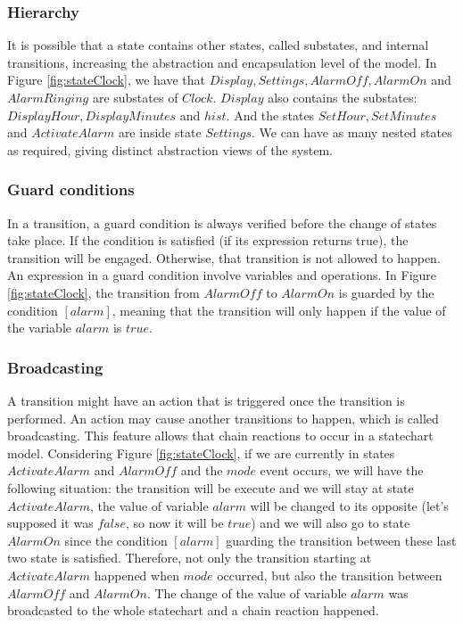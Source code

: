 \subsubsection{Hierarchy}

It is possible that a state contains other states, called substates, and internal transitions, increasing the abstraction and encapsulation level of the model. In Figure \ref{fig:stateClock}, we have that $Display, Settings, AlarmOff, AlarmOn$ and $AlarmRinging$ are substates of $Clock$. $Display$ also contains the substates: $DisplayHour, DisplayMinutes$ and $hist$. And the states $SetHour, SetMinutes$ and $ActivateAlarm$ are inside state $Settings$. We can have as many nested states as required, giving distinct abstraction views of the system.

\subsubsection{Guard conditions}

In a transition, a guard condition is always verified before the change of states take place. If the condition is satisfied (if its expression returns true), the transition will be engaged. Otherwise, that transition is not allowed to happen. An expression in a guard condition involve variables and operations. In Figure \ref{fig:stateClock}, the transition from $AlarmOff$ to $AlarmOn$ is guarded by the condition $[alarm]$, meaning that the transition will only happen if the value of the variable $alarm$ is $true$.

\subsubsection{Broadcasting}

A transition might have an action that is triggered once the transition is performed.  An action may cause another transitions to happen, which is called broadcasting. This feature allows that chain reactions to occur in a statechart model. Considering Figure \ref{fig:stateClock}, if we are currently in states $ActivateAlarm$ and $AlarmOff$ and the $mode$ event occurs, we will have the following situation: the transition will be execute and we will stay at state $ActivateAlarm$, the value of variable $alarm$ will be changed to its opposite (let's supposed it was $false$, so now it will be $true$) and we will also go to state $AlarmOn$ since the condition $[alarm]$ guarding the transition between these last two state is satisfied. Therefore, not only the transition starting at $ActivateAlarm$ happened when $mode$ occurred, but also the transition between $AlarmOff$ and $AlarmOn$. The change of the value of variable $alarm$ was broadcasted to the whole statechart and a chain reaction happened.

